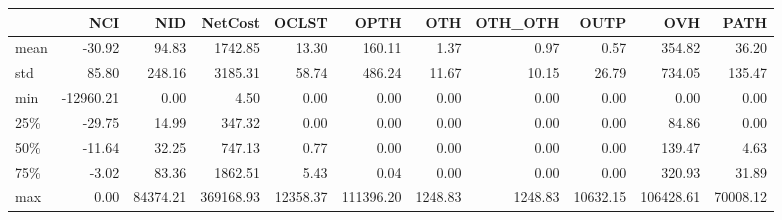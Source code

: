 \begin{tabular}{lrrrrrrrrrr}
\toprule
{} &       NCI &       NID &    NetCost &     OCLST &       OPTH &      OTH &  OTH\_OTH &      OUTP &        OVH &      PATH \\
\midrule
mean &    -30.92 &     94.83 &    1742.85 &     13.30 &     160.11 &     1.37 &     0.97 &      0.57 &     354.82 &     36.20 \\
std  &     85.80 &    248.16 &    3185.31 &     58.74 &     486.24 &    11.67 &    10.15 &     26.79 &     734.05 &    135.47 \\
min  & -12960.21 &      0.00 &       4.50 &      0.00 &       0.00 &     0.00 &     0.00 &      0.00 &       0.00 &      0.00 \\
25\%  &    -29.75 &     14.99 &     347.32 &      0.00 &       0.00 &     0.00 &     0.00 &      0.00 &      84.86 &      0.00 \\
50\%  &    -11.64 &     32.25 &     747.13 &      0.77 &       0.00 &     0.00 &     0.00 &      0.00 &     139.47 &      4.63 \\
75\%  &     -3.02 &     83.36 &    1862.51 &      5.43 &       0.04 &     0.00 &     0.00 &      0.00 &     320.93 &     31.89 \\
max  &      0.00 &  84374.21 &  369168.93 &  12358.37 &  111396.20 &  1248.83 &  1248.83 &  10632.15 &  106428.61 &  70008.12 \\
\bottomrule
\end{tabular}
